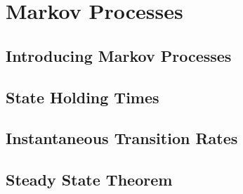 \chapter{Markov Processes}



\section{Introducing Markov Processes}




\section{State Holding Times}



\section{Instantaneous Transition Rates}



\section{Steady State Theorem}